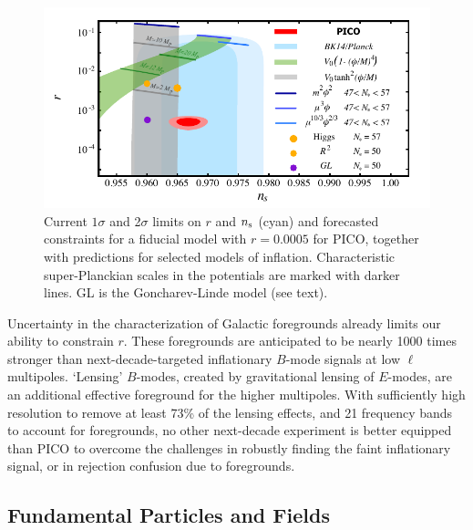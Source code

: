 \documentclass[PICOAPC.tex]{subfiles}
\begin{document}
\begin{figure}[!thb]
\parbox{4.5in}{\centerline{
\includegraphics[width=4.5in]{images/nsrlabeledrp0005_PICOv2.pdf} } }
\parbox{1.8in}{
\caption{\captiontext  Current $1\sigma$ and 2$\sigma$ limits on $r$ and $n_{\rm s}$ (cyan) and forecasted constraints for a fiducial model with $r = 0.0005$ for PICO, together with predictions for selected models of inflation. Characteristic super-Planckian scales in the potentials are marked with darker lines. GL is the Goncharev-Linde model (see text). }
\label{fig:nsr}}
\vspace{-0.1in}
\end{figure}

Uncertainty in the characterization of Galactic foregrounds already limits our ability to constrain $r$. These foregrounds 
are anticipated to be nearly 1000 times stronger than next-decade-targeted inflationary $B$-mode signals at low $\ell$ multipoles. %
`Lensing' $B$-modes, created by gravitational lensing of $E$-modes, are an additional effective foreground for the higher multipoles. With sufficiently high resolution to remove at least 73\% of the lensing effects, and 21 frequency bands to account for foregrounds, no other next-decade experiment is better equipped than PICO to overcome the challenges in robustly finding the faint inflationary signal, or in rejection confusion due to foregrounds. 


\subsection{Fundamental Particles and Fields} %
\label{sec:relics_neutrinos}
\end{document}
